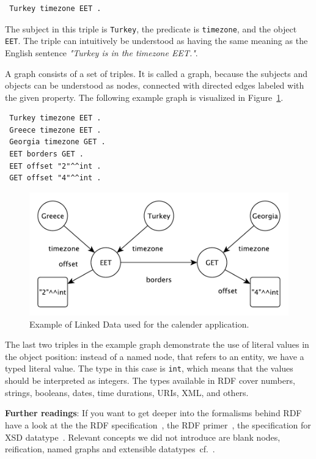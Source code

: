 \begin{verbatim}
 Turkey timezone EET .
\end{verbatim}

The subject in this triple is \texttt{Turkey}, the predicate is \texttt{timezone}, and the object \texttt{EET}.
The triple can intuitively be understood as having the same meaning as the English sentence \textit{"Turkey is in the timezone EET."}.

A graph consists of a set of triples.
It is called a graph, because the subjects and objects can be understood as nodes, connected with directed edges labeled with the given property.
The following example graph is visualized in Figure~\ref{fig:graph}.
\begin{verbatim}
 Turkey timezone EET .
 Greece timezone EET .
 Georgia timezone GET .
 EET borders GET .
 EET offset "2"^^int .
 GET offset "4"^^int . 
\end{verbatim}

\begin{figure}
\includegraphics[width=\linewidth]{part_01/fig_graph.pdf}
\caption{Example of Linked Data used for the calender application.}
\label{fig:graph}
\end{figure}

The last two triples in the example graph demonstrate the use of literal values in the object position: instead of a named node, that refers to an entity, we have a typed literal value.
The type in this case is \texttt{int}, which means that the values should be interpreted as integers.
The types available in RDF cover numbers, strings, booleans, dates, time durations, URIs, XML, and others.

\medskip

\textbf{Further readings}:
If you want to get deeper into the formalisms behind RDF have a look at the the RDF specification~\cite{rdf-spec}, 
the RDF primer~\cite{rdfprimer}, 
the specification for XSD datatype~\cite{xsd-part2}.
Relevant concepts we did not introduce are blank nodes, reification, named graphs and extensible datatypes~cf.~\cite{namedgraphs,rdfprimer}.

